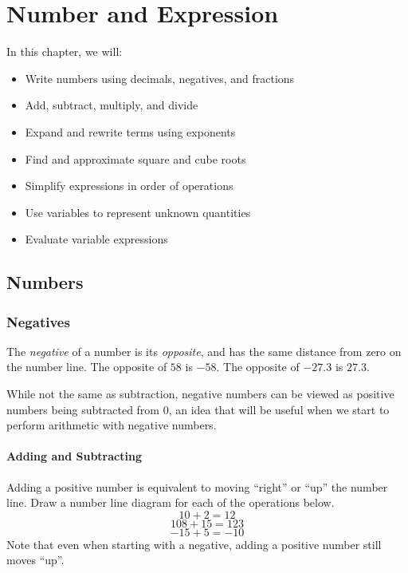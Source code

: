 

\chapter{Number and Expression}

\begin{summary}
In this chapter, we will:
\begin{itemize}
    \item Write numbers using decimals, negatives, and fractions
    \item Add, subtract, multiply, and divide
    \item Expand and rewrite terms using exponents
    \item Find and approximate square and cube roots
    \item Simplify expressions in order of operations 
    \item Use variables to represent unknown quantities
    \item Evaluate variable expressions
    
\end{itemize}
\end{summary}



\newpage 
\section{Numbers}

\subsection{Negatives}
\begin{definition}[Negative]
The \emph{negative} of a number is its \emph{opposite}, and has the same distance from zero on the number line.  The opposite of \(58\) is \(-58\).  The opposite of \(-27.3\) is \(27.3\).  
\end{definition}

While not the same as subtraction, negative numbers can be viewed as positive numbers being subtracted from \(0\), an idea that will be useful when we start to perform arithmetic with negative numbers.  

\subsubsection{Adding and Subtracting} 
Adding a positive number is equivalent to moving ``right'' or ``up'' the number line.  
Draw a number line diagram for each of the operations below. 
\[10 + 2 = 12  \]
\[ 108 + 15 = 123  \]
\[  -15 + 5 = -10   \]
Note that even when starting with a negative, adding a positive number still moves ``up''. 

